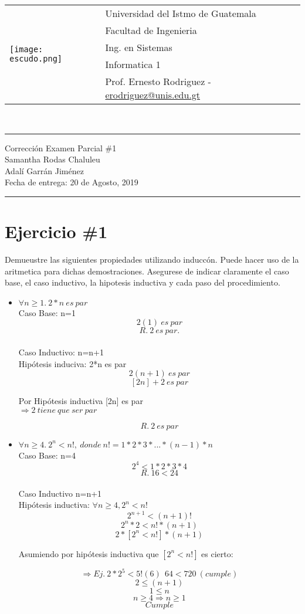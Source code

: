 \documentclass{article}
\newcommand{\horrule}[1]{\rule{\linewidth}{#1}}
\begin{document}
\begin{tabular}{l l}
\multirow{5}{*}{\texttt{[image: escudo.png]}} & Universidad del Istmo de Guatemala \\
 & Facultad de Ingenieria \\
 & Ing. en Sistemas \\
 & Informatica 1 \\
 & Prof. Ernesto Rodriguez - \href{mailto:erodriguez@unis.edu.gt}{erodriguez@unis.edu.gt} \\
\end{tabular}
\\

\begin{center}
        \horrule{0.5pt}
        \huge{Corrección Examen Parcial \#1} \\
        \large{Samantha Rodas Chaluleu}\\
        \large{Adalí Garrán Jiménez}\\
        \large{Fecha de entrega: 20 de Agosto, 2019} \\
        \horrule{1pt}
\end{center}

\section*{Ejercicio \#1}
Demueustre las siguientes propiedades utilizando induccón. Puede hacer uso de la aritmetica para dichas demostraciones. Asegurese de indicar claramente el caso base, el caso inductivo, la hipotesis inductiva y cada paso del procedimiento.\\
\begin{itemize}
    \item $\forall n\geq 1.~2*n~es~par$\\
    Caso Base: n=1
\[
2(1)~es~par
\]
\[
R.~2~es~par.
\]\\
Caso Inductivo: n=n+1\\
Hipótesis induciva: 2*n es par\\
\[
2(n+1)~es~par
\]
\[
[2n]+2~es~par
\]
\begin{center}Por Hipótesis inductiva [2n] es par\\
$\Rightarrow 2~tiene~que~ser~par$\end{center}
\[
R.~2~es~par
\]
    \item $\forall n\geq 4.~2^n<n!,~donde~n!=1*2*3*...*(n-1)*n$\\
Caso Base: n=4\\
\[2^4<1*2*3*4\]
\[R.~16<24\]\\
Caso Inductivo n=n+1\\
Hipótesis inductiva: $\forall n \geq 4,2^n<n!$
\[2^{n+1}<(n+1)!\]
\[2^n*2<n!*(n+1)\]
\[2*[2^n<n!]*(n+1)\]
\begin{center}Asumiendo por hipótesis inductiva que $[2^n<n!]$ es cierto:\end{center}
\[\Rightarrow Ej.\ 2 \ast 2^{5} < 5! (6)\ \ 64<720 \ (cumple)\]
\[2\leq(n+1)\]
\[1\leq n\]
\[n\geq 4 \Rightarrow n\geq 1\]
\[Cumple\]
\end{itemize}
\end{document}

